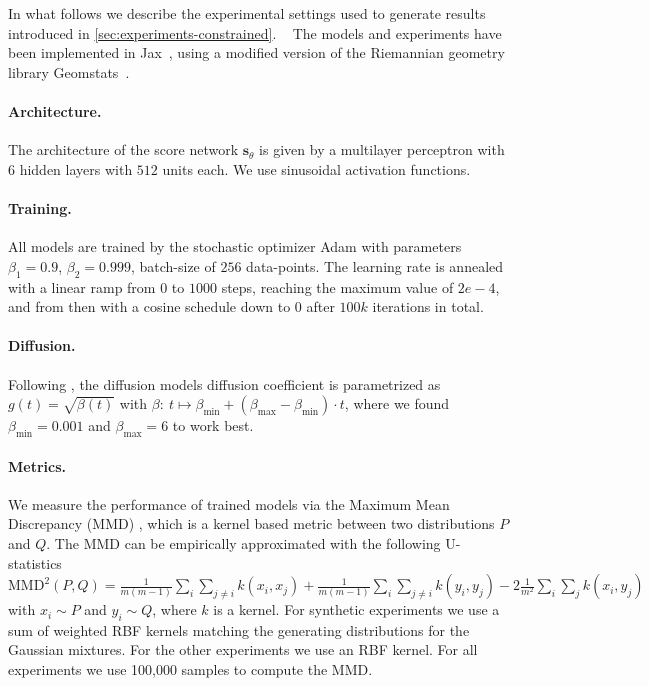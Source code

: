 In what follows we describe the experimental settings used to generate results introduced in \cref{sec:experiments-constrained}.
~
The models and experiments have been implemented in Jax~\parencite{jax2018github}, using a modified version of the Riemannian geometry library Geomstats~\parencite{geomstats2020}.

\paragraph{Architecture.}
The architecture of the score network $\bm{s}_\theta$ is given by a multilayer perceptron with $6$ hidden layers with $512$ units each.
We use sinusoidal activation functions.

\paragraph{Training.}
All models are trained by the stochastic optimizer Adam \parencite{kingma2014method} with parameters $\beta_1=0.9$, $\beta_2=0.999$, batch-size of $256$ data-points.
The learning rate is annealed with a linear ramp from $0$ to $1000$ steps, reaching the maximum value of $2e-4$, and from then with a cosine schedule down to $0$ after $100k$ iterations in total.

\paragraph{Diffusion.}
Following \textcite{song2020score}, the diffusion models diffusion coefficient is parametrized as $g(t) = \sqrt{\beta(t)}$ with $\beta: \ t \mapsto \beta_{\min} + (\beta_{\max} - \beta_{\min}) \cdot t$, where we found $\beta_{\min}=0.001$ and $\beta_{\max}=6$ to work best.

\paragraph{Metrics.}
We measure the performance of trained models via the Maximum Mean Discrepancy (MMD) \parencite{gretton2012kernel}, which is a kernel based metric between two distributions $P$ and $Q$.
The MMD can be empirically approximated with the following U-statistics $\mathrm{MMD}^2(P, Q) = \tfrac{1}{m(m-1)} \sum_i \sum_{j \neq i} k(x_i, x_j) + \tfrac{1}{m(m-1)} \sum_i \sum_{j \neq i} k(y_i, y_j) - 2 \tfrac{1}{m^2} \sum_i \sum_{j} k(x_i, y_j)$ with $x_i \sim P$ and $y_i \sim Q$, where $k$ is a kernel.
For synthetic experiments we use a sum of weighted RBF kernels matching the generating distributions for the Gaussian mixtures.
For the other experiments we use an RBF kernel.
For all experiments we use 100,000 samples to compute the MMD.

